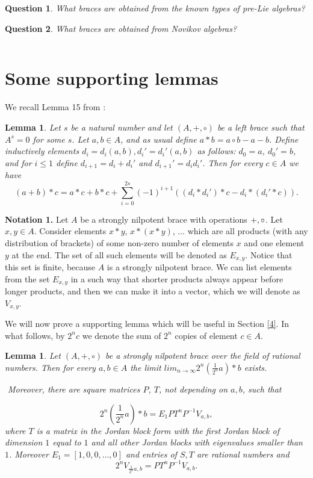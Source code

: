 \documentclass[12pt]{article}
\newtheorem{lemma}[theorem]{Lemma}
\newtheorem{question}{Question}
\begin{document}
\begin{question}
What braces are obtained from the  known types of pre-Lie algebras?
\end{question}


\begin{question}
What braces are obtained from Novikov algebras?
\end{question}

$ $


\section{Some supporting lemmas}

We recall  Lemma 15 from \cite{Engel}:

\begin{lemma}\label{fajny}
 Let $s$ be a natural number and let $(A, +, \circ)$ be a left brace such that $A^{s}=0$ for some $s$.
 Let $a, b\in A$, and as usual define $a*b=a\circ b-a-b$.
Define inductively elements $d_{i}=d_{i}(a,b), d_{i}'=d_{i}'(a, b)$  as follows:
$d_{0}=a$, $d_{0}'=b$, and for $i\leq 1$ define $d_{i+1}=d_{i}+d_{i}'$ and $d_{i+1}'=d_{i}d_{i}'$.
 Then for every $c\in A$ we have
\[(a+b)*c=a*c+b*c+\sum _{i=0}^{2s} (-1)^{i+1}((d_{i}*d_{i}')*c-d_{i}*(d_{i}'*c)).\]
\end{lemma}



{\bf Notation 1.} Let $A$ be a strongly nilpotent  brace with operations $+, \circ \*$. Let $x, y\in A$. Consider elements $x*y$, $x*(x*y)$, $\ldots $
 which are all products (with any distribution of brackets) of some non-zero number of  elements $x$ and one element $y$ at the end.
 The set of all such elements will be denoted as $E_{x,y}$. Notice that this set is finite, because $A$ is a strongly nilpotent brace. 
 We can list elements from the set $E_{x,y}$ in a such way that shorter products always appear before longer products, and then we can make it into a vector, which we will denote as $V_{x,y}$.


 We will now prove a supporting  lemma which will be useful in Section \ref{4}. In what follows, by $2^{n}c$ we denote the sum of $2^{n}$ copies of element $c\in A$.

\begin{lemma}\label{newest}
 Let $(A, +, \circ )$ be a  strongly  nilpotent  brace over the field of rational numbers. Then for every
$a, b\in A$ the limit $lim _{n\rightarrow \infty }2^{n}({\frac 1{2^{n}}} a)*b$ exists.

$ $ 
Moreover, there are  square matrices $P$, $T$, not depending on $a,b$, such that 

\[2^{n}({\frac 1{2^{n}}} a)*b=E_{1}PT^{n}P^{-1}V_{a,b},\]
 where $T$ is a matrix in the Jordan block form with the first Jordan block of dimension $1$  equal to $1$ and all other Jordan blocks with eigenvalues smaller than $1$. Moreover $E_{1}=[1, 0, 0, \ldots ,0]$ and entries of $S, T$ are rational numbers and
\[2^{n}V_{{\frac 1{2^{n}}} a, b}=PT^{n}P^{-1}V_{a,b}.\] 
\end{lemma}
\end{document}
